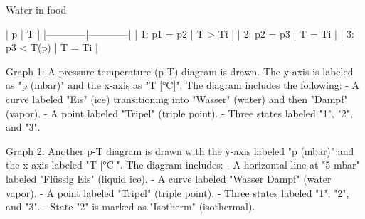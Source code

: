 Water in food  

| p          | T          |  
|------------|------------|  
| 1: p1 = p2 | T > Ti     |  
| 2: p2 = p3 | T = Ti     |  
| 3: p3 < T(p) | T = Ti   |  

Graph 1:  
A pressure-temperature (p-T) diagram is drawn. The y-axis is labeled as "p (mbar)" and the x-axis as "T [°C]". The diagram includes the following:  
- A curve labeled "Eis" (ice) transitioning into "Wasser" (water) and then "Dampf" (vapor).  
- A point labeled "Tripel" (triple point).  
- Three states labeled "1", "2", and "3".  

Graph 2:  
Another p-T diagram is drawn with the y-axis labeled "p (mbar)" and the x-axis labeled "T [°C]". The diagram includes:  
- A horizontal line at "5 mbar" labeled "Flüssig Eis" (liquid ice).  
- A curve labeled "Wasser Dampf" (water vapor).  
- A point labeled "Tripel" (triple point).  
- Three states labeled "1", "2", and "3".  
- State "2" is marked as "Isotherm" (isothermal).